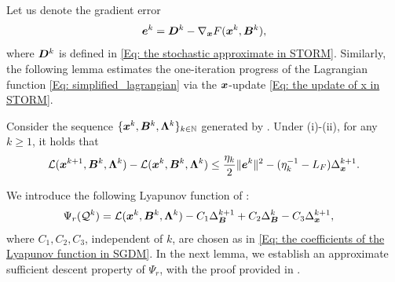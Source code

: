 Let us denote the gradient error \[\bm{e}^{k} = \bm{D}^{k} - \nabla_{\bm{x}}F(\bm{x}^{k}, \bm{B}^{k})
,\]where $\bm{D}^k$ is defined in \eqref{Eq: the stochastic approximate in STORM}. Similarly, the following lemma estimates the one-iteration progress 
of the Lagrangian function \eqref{Eq: simplified_lagrangian} via the $\bm{x}$-update \eqref{Eq: the update of x in STORM}.
\begin{lemma}
    \label{Lemma: One-iteration progress of x in STORM} Consider the sequence $\{\bm{x}^k, \bm{B}^k, \bm{\Lambda}^k\}_{k \in \mathbb{N}}$ generated by . Under (i)-(ii), for any $k \geq 1$, it holds that
    \begin{align}
        \label{Eq: the recursive relation of L on x}\mathcal{L} (\bm{x}^{k+1}, \bm{B}^{k}, \bm{\Lambda}^{k}) - \mathcal{L} (\bm{x}^{k}, \bm{B}^{k}, \bm{\Lambda}^{k}) \leq \frac{\eta_{k}}{2}\| \bm{e}^{k}\|^{2}- (\eta_{k}^{-1}- L_{F})\Delta_{\bm{x}}^{k+1}.
    \end{align}
\end{lemma}
We introduce the following Lyapunov function of :
\begin{align}
    \Psi_r(\mathcal{Q}^{k}) &= \mathcal{L}(\bm{x}^{k}, \bm{B}^{k}, \bm{\Lambda}^{k}) 
    - C_{1}\Delta_{\bm{B}}^{k+1}+ C_{2}\Delta_{\bm{B}}^{k}- C_{3}\Delta_{\bm{x}}^{k+1},
    \label{Eq: the Lyapunov function in STORM} 
\end{align}where $C_1, C_2, C_3$, independent of $k$, are chosen as in 
\eqref{Eq: the coefficients of the Lyapunov function in SGDM}.
In the next lemma, we establish an approximate sufficient descent property 
of $\Psi_r$, with the proof provided in .
